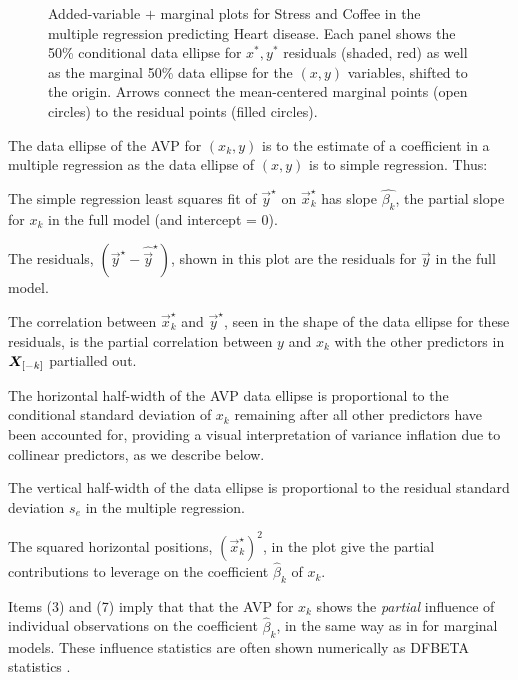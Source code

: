\begin{figure}[htb]
\begin{minipage}[b]{.49\linewidth}
 \end{minipage}
  \caption{Added-variable $+$ marginal plots for Stress and Coffee in the multiple regression predicting Heart disease.
Each panel shows the 50\% conditional data ellipse for $x^{*}, y^{*}$ residuals (shaded, red) as well as the marginal 50\%
data ellipse for the $(x, y)$ variables, shifted to the origin.
Arrows connect the mean-centered marginal points (open circles) to the residual points (filled circles).}
  \label{fig:coffee-avplot-B}
\end{figure}

\begin{enumerate*}
 \item The data ellipse of the AVP for $(x_k, y)$ is to the estimate of a coefficient in a multiple regression as
 the data ellipse of $(x, y)$ is to simple regression. Thus:

 \item The simple regression least squares fit of $\vec{y}^\star$ on $\vec{x}_k^\star$ has slope $\hat{\beta_k}$,
 the partial slope for $x_k$ in the full model (and intercept = 0).

 \item The residuals, $(\vec{y}^\star - \widehat{\vec{y}}^\star)$, shown in this plot are the residuals for $\vec{y}$ in the full model.

 \item The correlation between $\vec{x}_k^\star$ and $\vec{y}^\star$, seen in the shape of the data ellipse for these residuals,
 is the partial correlation between $y$ and $x_k$ with the other predictors in $\bm{X}_{[-k]}$ partialled out.

 \item The horizontal half-width of the AVP data ellipse is proportional to the conditional standard deviation of
 $x_k$ remaining after all other predictors have been accounted for, providing a visual interpretation
 of variance inflation due to collinear predictors, as we describe below.

 \item The vertical half-width of the data ellipse is proportional to the residual standard deviation $s_e$ in the multiple regression.

 \item The squared horizontal positions, $(\vec{x}_k^\star)^2$, in the plot give the partial contributions
 to leverage on the coefficient $\hat{\beta}_k$ of $x_k$. 

 \item Items (3) and (7) imply that 
 that the AVP for $x_k$ shows the \emph{partial} influence of individual observations on the coefficient $\hat{\beta}_k$, 
 in the same way as in  for marginal models. These influence statistics are
 often shown numerically
 as DFBETA statistics \citep{Belsley-etal:80}.
 

\end{enumerate*}
